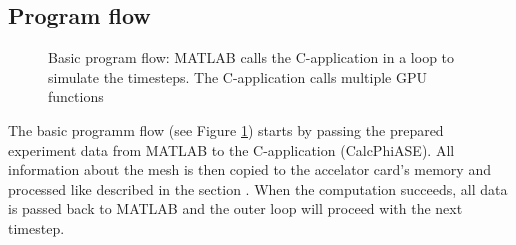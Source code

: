 \subsection{Program flow}
\label{subsec:program_flow}
\begin{figure}[H]
  \centerline
  {}
  \caption{Basic program flow: MATLAB calls the C-application in a loop to
  simulate the timesteps. The C-application calls multiple GPU functions}
  \label{graphic:pap1}
\end{figure}

The basic programm flow (see Figure \ref{graphic:pap1}) starts
by passing the prepared experiment data from MATLAB \cite{matlab}
to the C-application (CalcPhiASE). All information about the mesh is then copied
to the accelator card's memory and processed like described in 
the section . When the computation succeeds, 
all data is passed back to MATLAB and the outer loop will proceed 
with the next timestep. 

